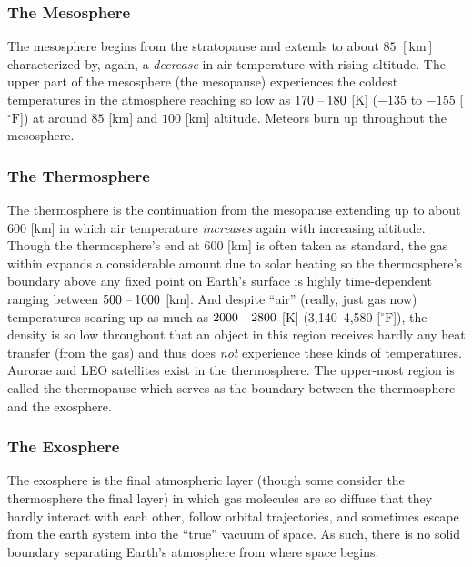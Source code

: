 \documentclass[11pt,dvipsnames]{thesis}
\begin{document}
\subsubsection{The Mesosphere}
The mesosphere begins from the stratopause and extends to about $85$ $[\si{\km}]$ characterized by, again, a \textit{decrease} in air temperature with rising altitude. The upper part of the mesosphere (the mesopause) experiences the coldest temperatures in the atmosphere reaching so low as $170\hspace{0.5ex}$--$\hspace{0.5ex}180$ [\si{\K}] ($-135$ to $-155$ [$^\circ\mathrm{F}$]) at around $85$ [\si{\km}] and $100$ [\si{\km}] altitude. Meteors burn up throughout the mesosphere.

\subsubsection{The Thermosphere}
The thermosphere is the continuation from the mesopause extending up to about $600$ [\si{\km}] in which air temperature \textit{increases} again with increasing altitude. Though the thermosphere's end at $600$ [\si{\km}] is often taken as standard, the gas within expands a considerable amount due to solar heating so the thermosphere's boundary above any fixed point on Earth's surface is highly time-dependent ranging between $500\hspace{0.5ex}$--$\hspace{0.5ex}1000$ [\si{\km}].
And despite ``air'' (really, just gas now) temperatures soaring up as much as $2000\hspace{0.5ex}$--$\hspace{0.5ex}2800$ [\si{\K}] (3,140\hspace{0.5ex}--\hspace{0.5ex}4,580 [$^\circ\mathrm{F}$]), the density is so low throughout that an object in this region receives hardly any heat transfer (from the gas) and thus does \textit{not} experience these kinds of temperatures.
Aurorae and LEO satellites exist in the thermosphere. The upper-most region is called the thermopause which serves as the boundary between the thermosphere and the exosphere.

\subsubsection{The Exosphere}
The exosphere is the final atmospheric layer (though some consider the thermosphere the final layer) in which gas molecules are so diffuse that they hardly interact with each other, follow orbital trajectories, and sometimes escape from the earth system into the ``true'' vacuum of space. As such, there is no solid boundary separating Earth's atmosphere from where space begins.
\end{document}

